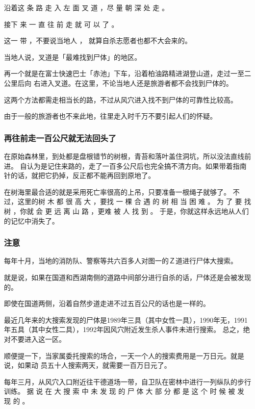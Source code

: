 \documentclass[UTF8]{ctexart}
\begin{document}
沿着这 条 路 走 入 左 面 叉 道 ，尽 量 朝 深 处 走 。

接下 来 一 直 往 前 走 就 可 以 了 。

这一 带 ，不要说当地人 ， 就算自杀志愿者也都不大会来的。

当地人说，叉道是「最难找到尸体」的地区。

再一个就是在富士快速巴士「赤池」下车，沿着柏油路精进湖登山道，走过一至二公里后向
右进入叉道。在这里，不论当地人还是旅游者都不会找到尸体的。

这两个方法都需走相当长的路，不过从风穴进入找不到尸体的可靠性比较高。

由于一般的旅游者也不来此地，往里走入时千万不要引起人们的怀疑。

\subsubsection*{再往前走一百公尺就无法回头了}

在原始森林里，到处都是盘根错节的树根，青苔和落叶盖住洞坑，所以没法直线前进。
自认为是记住来路的，走了一百多公尺后也完全搞不清方向。如果带着指南针的话，就把它扔掉，反正都不能再回到原地了。

在树海里最合适的就是采用死亡率很高的上吊，只要准备一根绳子就够了。
不过，这里的树 木 都 很 高 大 ，要找 一 棵 合 遇 的 树 相 当 困 难 。
为 了 要 找 树 ，你就 会 更 远 离 山 路 ，更难 被 人 找 到 。 
于是，你就这样永远地从人们的记忆中消失了。

\subsubsection{注意}

每年十月，当地的消防队、警察等共六百多人对图一的Ｚ道进行尸体大搜索。

就是说，如果在国道和西湖南侧的道路中间部分进行自杀的话，尸体还是会被发现的。

即使在国道两侧，沿着自然步道走进不过五百公尺的话也是一样的。

最近几年来的大搜索发现的尸体是1989年三具（其中女性一具），1990年无，1991年五具（其中女性二具），1992年因风穴附近发生杀人事件未进行搜索。
总之，绝对不要进入这一区。

顺便提一下，当家属委托搜索的场合，一天一个人的搜索费用是一万日元。就是说，如果动
员五十人搜索两天，就需要一百万日元了。

每年三月，从风穴入口附近往干德道场一带，自卫队在密林中进行一列纵队的步行训练。
据 说 在 大 搜 索 中 未 发 现 的 尸 体 大 部 分 都 是 这 个 时 候 被 发 现 的 。
\end{document}
